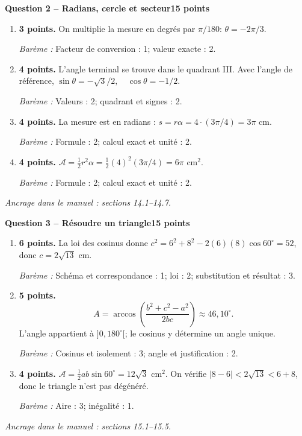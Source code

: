 \documentclass[11pt,a4paper]{article}
\begin{document}
\newpage
{\large\bfseries Question 2 -- Radians, cercle et secteur}\hfill\textbf{15 points}\par
\begin{enumerate}
\item \textbf{3 points.} On multiplie la mesure en degrés par \(\pi/180\): \(\theta=-2\pi/3\).
\par{\small\textit{Barème : }Facteur de conversion : 1; valeur exacte : 2.}
\item \textbf{4 points.} L’angle terminal se trouve dans le quadrant III. Avec l’angle de référence, \(\sin\theta=-\sqrt3/2,\quad\cos\theta=-1/2\).
\par{\small\textit{Barème : }Valeurs : 2; quadrant et signes : 2.}
\item \textbf{4 points.} La mesure est en radians : \(s=r\alpha=4\cdot(3\pi/4)=3\pi\) cm.
\par{\small\textit{Barème : }Formule : 2; calcul exact et unité : 2.}
\item \textbf{4 points.} \(\mathcal A=\frac12r^2\alpha=\frac12(4)^2(3\pi/4)=6\pi\) cm\(^2\).
\par{\small\textit{Barème : }Formule : 2; calcul exact et unité : 2.}
\end{enumerate}
\vfill {\small\textit{Ancrage dans le manuel : sections 14.1--14.7.}}

\newpage
{\large\bfseries Question 3 -- Résoudre un triangle}\hfill\textbf{15 points}\par
\begin{enumerate}
\item \textbf{6 points.} La loi des cosinus donne \(c^2=6^2+8^2-2(6)(8)\cos60^\circ=52\), donc \(c=2\sqrt{13}\) cm.
\par{\small\textit{Barème : }Schéma et correspondance : 1; loi : 2; substitution et résultat : 3.}
\item \textbf{5 points.} \[A=\arccos\!\left(\frac{b^2+c^2-a^2}{2bc}\right)\approx 46{,}10^\circ.\] L’angle appartient à \(]0,180^\circ[\); le cosinus y détermine un angle unique.
\par{\small\textit{Barème : }Cosinus et isolement : 3; angle et justification : 2.}
\item \textbf{4 points.} \(\mathcal A=\frac12 ab\sin60^\circ=12\sqrt3\) cm\(^2\). On vérifie \(|8-6|<2\sqrt{13}<6+8\), donc le triangle n’est pas dégénéré.
\par{\small\textit{Barème : }Aire : 3; inégalité : 1.}
\end{enumerate}
\vfill {\small\textit{Ancrage dans le manuel : sections 15.1--15.5.}}
\end{document}
